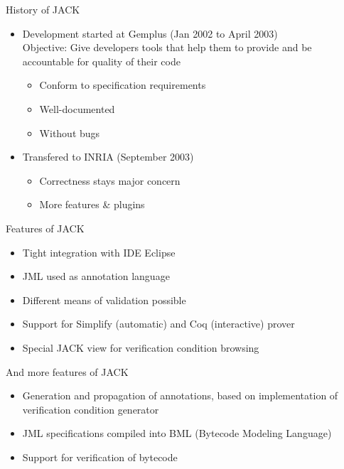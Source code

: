 \documentclass[final,nocolorBG,a4,mobius,nototal,pdf,slideColor]{prosper}
\begin{document}
\begin{slide}{History of JACK}
\begin{itemize}
\item Development started at Gemplus (Jan 2002 to April 2003)\\
Objective: Give developers tools that help them to provide and be
accountable for quality of their code
\begin{itemize}
\item Conform to specification requirements
\item Well-documented
\item Without bugs
\end{itemize}
\item Transfered to INRIA (September 2003)
\begin{itemize}
\item Correctness stays major concern
\item More features \& plugins
\end{itemize}
\end{itemize}
\end{slide}

\begin{slide}{Features of JACK}
\begin{itemize}
\item Tight integration with IDE Eclipse
\item JML used as annotation language
\item Different means of validation possible
\item Support for Simplify (automatic) and Coq (interactive) prover
\item Special JACK view for verification condition browsing
\end{itemize}
\end{slide}

\begin{slide}{And more features of JACK}
\begin{itemize}
\item Generation and propagation of annotations, based on implementation of
verification condition generator
\item JML specifications compiled into BML (Bytecode Modeling Language)
\item Support for verification of bytecode 
\end{itemize}
\end{slide}
\end{document}
